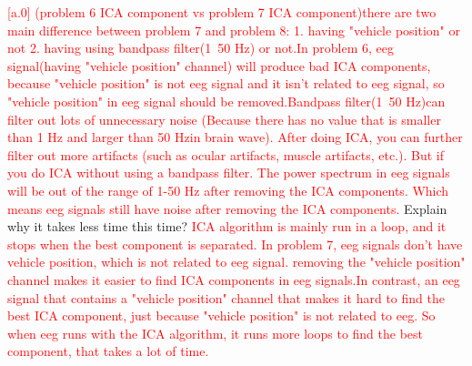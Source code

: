 \documentclass[a4 paper]{article}
\begin{document}
\begin{tcolorbox}[colback=RubineRed!5!white,colframe=RubineRed!75!black]
\textcolor{red}{[a.0] (problem 6 ICA component vs problem 7 ICA component)\newline there are two main difference between problem 7 and problem 8: 1. having "vehicle position" or not 2. having using bandpass filter(1~50 Hz) or not.\newline In problem 6, eeg signal(having "vehicle position" channel) will produce bad ICA components, because "vehicle position" is not eeg signal and it isn't related to eeg signal, so "vehicle position" in eeg signal should be removed.\newline Bandpass filter(1~50 Hz)can filter out lots of unnecessary noise (Because there has no value that is smaller than 1 Hz and larger than 50 Hzin brain wave). After doing ICA, you can further filter out more artifacts (such as ocular artifacts, muscle artifacts, etc.). But if you do ICA without using a bandpass filter. The power spectrum in eeg signals will be out of the range of 1-50 Hz after removing the ICA components. Which means eeg signals still have noise after removing the ICA components.}
 Explain why it takes less time this time?
\textcolor{red}{\newline ICA algorithm is mainly run in a loop, and it stops when the best component is separated. In problem 7, eeg signals don’t have vehicle position, which is not related to eeg signal. removing the "vehicle position" channel makes it easier to find ICA components in eeg signals.\newline In contrast, an eeg signal that contains a "vehicle position" channel that makes it hard to find the best ICA component, just because "vehicle position" is not related to eeg. So when eeg runs with the ICA algorithm, it runs more loops to find the best component, that takes a lot of time.}
\end{tcolorbox}
\end{document}
